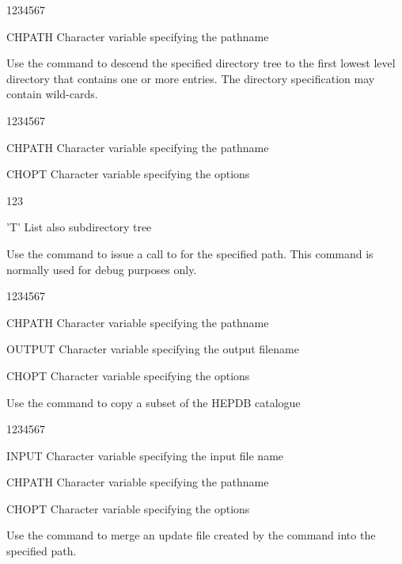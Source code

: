 
\begin{DLtt}{1234567}
\item[CHPATH]Character variable specifying the pathname
\end{DLtt}

Use the  command to descend the specified
directory tree to the first lowest level directory that
contains one or more entries. The directory specification
may contain wild-cards.


\begin{DLtt}{1234567}
\item[CHPATH]Character variable specifying the pathname
\item[CHOPT]Character variable specifying the options
  \begin{DLtt}{123}
    \item['T']List also subdirectory tree
  \end{DLtt}
\end{DLtt}

Use the  command to issue a call to  for the specified
path. This command is normally used for debug purposes only.


\begin{DLtt}{1234567}
\item[CHPATH]Character variable specifying the pathname
\item[OUTPUT]Character variable specifying the output filename
\item[CHOPT]Character variable specifying the options
\end{DLtt}

Use the  command to copy a subset of the HEPDB catalogue


\begin{DLtt}{1234567}
\item[INPUT]Character variable specifying the input file name
\item[CHPATH]Character variable specifying the pathname
\item[CHOPT]Character variable specifying the options
\end{DLtt}

Use the  command to merge an update file created by
the  command into the specified path.

